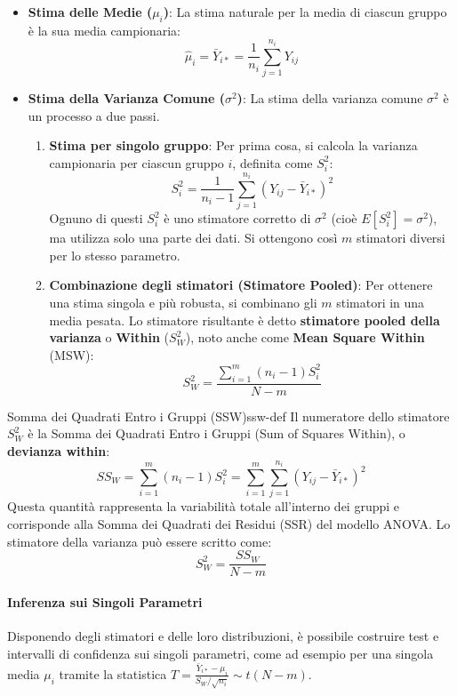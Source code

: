 \begin{itemize}
    \item \textbf{Stima delle Medie (\(\mu_i\))}: La stima naturale per la media
    di ciascun gruppo è la sua media campionaria:
    \[ \hat{\mu}_i = \bar{Y}_{i*} = \frac{1}{n_i} \sum_{j=1}^{n_i} Y_{ij} \]

    \item \textbf{Stima della Varianza Comune (\(\sigma^2\))}: La stima della
    varianza comune \(\sigma^2\) è un processo a due passi.
    \begin{enumerate}
        \item \textbf{Stima per singolo gruppo}: Per prima cosa, si calcola la
        varianza campionaria per ciascun gruppo \(i\), definita come \(S_i^2\):
        \[ S_i^2 = \frac{1}{n_i-1} \sum_{j=1}^{n_i} (Y_{ij} - \bar{Y}_{i*})^2 \]
        Ognuno di questi \(S_i^2\) è uno stimatore corretto di \(\sigma^2\)
        (cioè \(E[S_i^2] = \sigma^2\)), ma utilizza solo una parte dei dati. Si
        ottengono così \(m\) stimatori diversi per lo stesso parametro.
        
        \item \textbf{Combinazione degli stimatori (Stimatore Pooled)}: Per
        ottenere una stima singola e più robusta, si combinano gli \(m\)
        stimatori in una media pesata. Lo stimatore risultante è detto
        \textbf{stimatore pooled della varianza} o \textbf{Within} (\(S_W^2\)),
        noto anche come \textbf{Mean Square Within} (MSW):
        \[ S_W^2 = \frac{\sum_{i=1}^{m} (n_i-1)S_i^2}{N-m} \]
    \end{enumerate}
\end{itemize}

\begin{definizione}{Somma dei Quadrati Entro i Gruppi (SSW)}{ssw-def}
Il numeratore dello stimatore \(S_W^2\) è la Somma dei Quadrati Entro i Gruppi
(Sum of Squares Within), o \textbf{devianza within}:
\[ SS_W = \sum_{i=1}^{m} (n_i-1)S_i^2 = \sum_{i=1}^{m} \sum_{j=1}^{n_i} (Y_{ij}
- \bar{Y}_{i*})^2 \]
Questa quantità rappresenta la variabilità totale all'interno dei gruppi e
corrisponde alla Somma dei Quadrati dei Residui (SSR) del modello ANOVA. Lo
stimatore della varianza può essere scritto come:
\[ S_W^2 = \frac{SS_W}{N-m} \]
\end{definizione}

\paragraph{Inferenza sui Singoli Parametri}
Disponendo degli stimatori e delle loro distribuzioni, è possibile costruire
test e intervalli di confidenza sui singoli parametri, come ad esempio per una
singola media \(\mu_i\) tramite la statistica \(T = \frac{\bar{Y}_{i*} -
\mu_i}{S_W / \sqrt{n_i}} \sim t(N-m)\).

